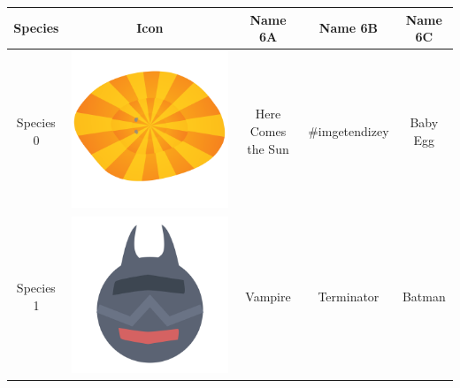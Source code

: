 \begin{table}
\centering
\begin{tabular}{ | c | c | c | c | c | }
\hline
Species   & Icon & Name 6A & Name 6B & Name 6C \\
\hline
Species 0  & \includegraphics[valign=m,scale=0.1]{images/species_00.png} & Here Comes the Sun & \#imgetendizey & Baby Egg \\ 
Species 1  & \includegraphics[valign=m,scale=0.1]{images/species_01.png} & Vampire & Terminator & Batman \\ 

\end{tabular}
\end{table}
